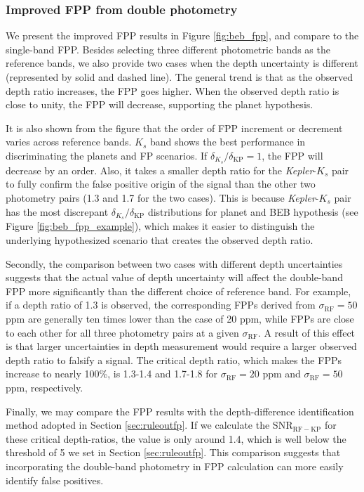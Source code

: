 \documentclass{aastex63}
\begin{document}
 \subsubsection{Improved FPP from double photometry}
 
    We present the improved FPP results in Figure \ref{fig:beb_fpp}, and compare to the single-band FPP. Besides selecting three different photometric bands as the reference bands, we also provide two cases when the depth uncertainty is different (represented by solid and dashed line). The general trend is that as the observed depth ratio increases, the FPP goes higher. When the observed depth ratio is close to unity, the FPP will decrease, supporting the planet hypothesis.
    
    It is also shown from the figure that the order of FPP increment or decrement varies across reference bands. $K_s$ band shows the best performance in discriminating the planets and FP scenarios. If $\delta_{K_s}/\delta_\mathrm{KP}=1$, the FPP will decrease by an order. Also, it takes a smaller depth ratio for the \emph{Kepler}-$K_s$ pair to fully confirm the false positive origin of the signal than the other two photometry pairs (1.3 and 1.7 for the two cases). This is because \emph{Kepler}-$K_s$ pair has the most discrepant $\delta_{K_s}/\delta_\mathrm{KP}$ distributions for planet and BEB hypothesis (see Figure \ref{fig:beb_fpp_example}), which makes it easier to distinguish the underlying hypothesized scenario that creates the observed depth ratio. 
    
    Secondly, the comparison between two cases with different depth uncertainties suggests that the actual value of depth uncertainty will affect the double-band FPP more significantly than the different choice of reference band. For example, if a depth ratio of 1.3 is observed, the corresponding FPPs derived from $\sigma_\mathrm{RF} = 50$ ppm are generally ten times lower than the case of 20 ppm, while FPPs are close to each other for all three photometry pairs at a given $\sigma_\mathrm{RF}$. A result of this effect is that larger uncertainties in depth measurement would require a larger observed depth ratio to falsify a signal. The critical depth ratio, which makes the FPPs increase to nearly 100\%, is 1.3-1.4 and 1.7-1.8 for $\sigma_\mathrm{RF} = 20$ ppm and $\sigma_\mathrm{RF} = 50$ ppm, respectively.
    
    Finally, we may compare the FPP results with the depth-difference identification method adopted in Section \ref{sec:ruleoutfp}. If we calculate the SNR$_\mathrm{RF-KP}$ for these critical depth-ratios, the value is only around 1.4, which is well below the threshold of 5 we set in Section \ref{sec:ruleoutfp}. This comparison suggests that incorporating the double-band photometry in FPP calculation can more easily identify false positives. 
\end{document}
